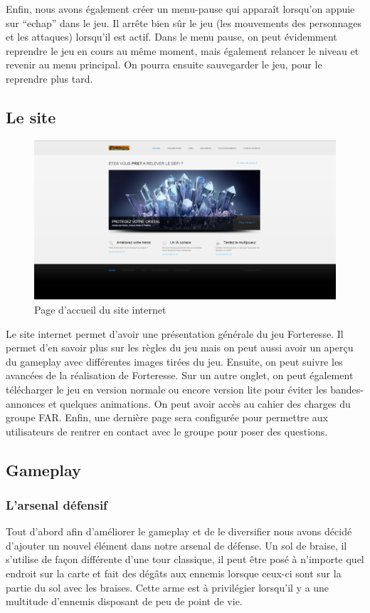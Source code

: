 \documentclass[a4paper, 12pt]{article}
\begin{document}
	\par Enfin, nous avons également créer un menu-pause qui apparaît lorsqu’on appuie sur “echap” dans le jeu. Il arrête bien sûr le jeu (les mouvements des personnages et les attaques) lorsqu’il est actif. Dans le menu pause, on peut évidemment reprendre le jeu en cours au même moment, mais également relancer le niveau et revenir au menu principal. On pourra ensuite sauvegarder le jeu, pour le reprendre plus tard.

	\subsection{Le site}
	 
	\begin{figure}[!ht]
		\centerline{\includegraphics[scale=0.3]{siteprojet.png}}
		\caption*{Page d'accueil du site internet}
	\end{figure}	 
	 
	 Le site internet permet d’avoir une présentation générale du jeu Forteresse. Il permet d’en savoir plus sur les règles du jeu mais on peut aussi avoir un aperçu du gameplay avec différentes images tirées du jeu. Ensuite, on peut suivre les avancées de la réalisation de Forteresse. Sur un autre onglet, on peut également télécharger le jeu en version normale ou encore version lite pour éviter les bandes-annonces et quelques animations. On peut avoir accès au cahier des charges du groupe FAR. Enfin, une dernière page sera configurée pour permettre aux utilisateurs de rentrer en contact avec le groupe pour poser des questions.


	\subsection{Gameplay}
		
		\subsubsection{L'arsenal défensif}
		Tout d’abord afin d’améliorer le gameplay et de le diversifier nous avons décidé d’ajouter un nouvel élément dans notre arsenal de défense. Un sol de braise, il s’utilise de façon différente d’une tour classique, il peut être posé à n’importe quel endroit sur la carte et fait des dégâts aux ennemis lorsque ceux-ci sont sur la partie du sol avec les braises. Cette arme est à privilégier lorsqu’il y a une multitude d’ennemis disposant de peu de point de vie.
\end{document}
